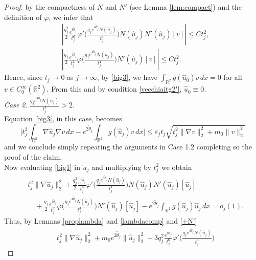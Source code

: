 \documentclass[11pt,leqno,twoside,reqno]{amsart}
\numberwithin{equation}{section}
\begin{document}
\begin{proof}
by the compactness of $N$ and $N'$ (see Lemma \ref{lem:compact}) 
and  the definition of $\varphi$, we infer that 
\begin{align*}
&\left|\frac{q_j^2}{2}\frac{e^{8\tilde{\theta}_j}}{t_j^6}\varphi'\Big(\frac{q_j e^{4\tilde{\theta}_j} N(\widehat{u}_j)}{t_j^{4} }\Big)
N(\widehat{u}_j) N'(\widehat{u}_j)[ v]\right|
{\leqslant} C  t_j^2,
\\
& \left|\frac{q_j}{2}\frac{e^{4\tilde{\theta}_j}}{t_j^2}\varphi\Big(\frac{q_j e^{4\tilde{\theta}_j}N(\widehat{u}_j)}{t_j^4}\Big)
N'(\widehat{u}_j)[ v] \right|
{\leqslant} C  t_j^2.
\end{align*}
Hence, since  $t_j\rightarrow 0$ as $j\rightarrow\infty$, by \eqref{big3}, 
we have $\int_{\mathbb R^{2}}g(\widehat u_0) v\,dx=0$ for all $ v\in C^\infty_0(\mathbb R^2)$.
From this and by condition \eqref{vecchiaitg2'}, $\widehat u_0\equiv 0$.\\
\textit{Case 2}. $\displaystyle\frac{q_j e^{4\tilde{\theta}_j} N(\widehat{u}_j)}{t_j^{4} }> 2$.\\
Equation \eqref{big3}, in this case, becomes
\[
\Big| t_j^2\int_{\mathbb R^{2}} \nabla \widehat{u}_j \nabla  v\,dx
-e^{2\tilde{\theta}_j}\int_{\mathbb R^{2}}g(\widehat{u}_j) v\,dx \Big|
{\leqslant} \varepsilon_jt_j\sqrt{t_j^2\|\nabla v\|_2^2+m_0\| v\|_2^2}
\]
and we conclude simply repeating the arguments in Case 1.2 completing so the proof of the claim. \\
Now evaluating \eqref{big1} in $\tilde u_j$ and multiplying by  $t_j^2$ we obtain
\begin{equation*} 
\begin{split}
&  t_j^2\|\nabla \widehat{u}_j\|_2^2+
\frac{q_j^2}{2}\frac{e^{8\tilde{\theta}_j}}{t_j^6}\varphi'\Big(\frac{q_j e^{4\tilde{\theta}_j} N(\widehat{u}_j)}{t_j^{4} }\Big)
N(\widehat{u}_j) N'(\widehat{u}_j)[\widehat{u}_j]\\
& \quad+\frac{q_j}{2}\frac{e^{4\tilde{\theta}_j}}{t_j^2}\varphi\Big(\frac{q_j e^{4\tilde{\theta}_j}N(\widehat{u}_j)}{t_j^4}\Big)
N'(\widehat{u}_j)[\widehat{u}_j] 
-e^{2\tilde{\theta}_j}\int_{\mathbb R^{2}}g(\widehat{u}_j)\widehat{u}_j\,dx 
= o_j(1).
\end{split}
\end{equation*}
Thus, by Lemmas \ref{proplambda} and \ref{lambdacomp} and \eqref{+N'}
\begin{equation}\label{big5}
\begin{split}
& t_j^2 \|\nabla \widehat{u}_j\|_2^2+ m_0 e^{2\tilde{\theta}_j}\|\widehat{u}_j\|_2^{2}+
3q_j^2\frac{e^{8\tilde{\theta}_j}}{t_j^6}\varphi'\Big(\frac{q_j e^{4\tilde{\theta}_j} N(\widehat{u}_j)}{t_j^{4} }\Big)

\end{split}
\end{equation}
\end{proof}
\end{document}
